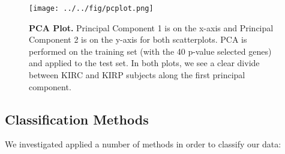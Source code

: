 \begin{figure}[H]
  \centering
    \texttt{[image: ../../fig/pcplot.png]}

\caption{\textbf{PCA Plot.} Principal Component 1 is on the x-axis and Principal
  Component 2 is on the y-axis for both scatterplots.  PCA is performed on the
  training set (with the 40 p-value selected genes) and applied to the test set.
  In both plots, we see a clear divide between 	KIRC and KIRP subjects along
  the first principal component.}
   \label{fig:pca}
\end{figure}



%
%



\subsection{Classification Methods}

We investigated applied a number of methods in order to classify our data:

